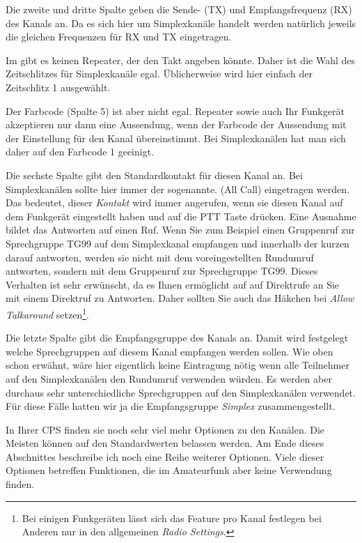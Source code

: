 Die zweite und dritte Spalte geben die Sende- (TX) und Empfangsfrequenz (RX) des Kanals an. Da es sich hier um Simplexkanäle handelt werden natürlich jeweils die gleichen Frequenzen für RX und TX eingetragen. 

Im  gibt es keinen Repeater, der den Takt angeben könnte. Daher ist die Wahl des Zeitschlitzes für Simplexkanäle egal. Üblicherweise wird hier einfach der Zeitschlitz 1 ausgewählt.

Der Farbcode (Spalte 5) ist aber nicht egal. Repeater sowie auch Ihr Funkgerät akzeptieren nur dann eine Aussendung, wenn der Farbcode der Aussendung mit der Einstellung für den Kanal übereinstimmt. Bei Simplexkanälen hat man sich daher auf den Farbcode 1 geeinigt. 

Die sechste Spalte gibt den Standardkontakt für diesen Kanal an. Bei Simplexkanälen sollte hier immer der sogenannte.  (All Call) eingetragen werden. Das bedeutet, dieser \emph{Kontakt} wird immer angerufen, wenn sie diesen Kanal auf dem Funkgerät eingestellt haben und auf die PTT Taste drücken. Eine Ausnahme bildet das Antworten auf einen Ruf. Wenn Sie zum Beispiel einen Gruppenruf zur Sprechgruppe TG99 auf dem Simplexkanal empfangen und innerhalb der kurzen  darauf antworten, werden sie nicht mit dem voreingestellten Rundumruf antworten, sondern mit dem Gruppenruf zur Sprechgruppe TG99. Dieses Verhalten ist sehr erwünscht, da es Ihnen ermöglicht auf auf Direktrufe an Sie mit einem Direktruf zu Antworten. Daher sollten Sie auch das Häkchen bei \emph{Allow Talkaround} setzen\footnote{Bei einigen Funkgeräten lässt sich das Feature pro Kanal festlegen bei Anderen nur in den allgemeinen \emph{Radio Settings}.}.  

Die letzte Spalte gibt die Empfangsgruppe des Kanals an. Damit wird festgelegt welche Sprechgruppen auf diesem Kanal empfangen werden sollen. Wie oben schon erwähnt, wäre hier eigentlich keine Eintragung nötig wenn alle Teilnehmer auf den Simplexkanälen den Rundumruf verwenden würden. Es werden aber durchaus sehr unterschiedliche Sprechgruppen auf den Simplexkanälen verwendet. Für diese Fälle hatten wir ja die Empfangsgruppe \emph{Simplex} zusammengestellt. 

In Ihrer CPS finden sie noch sehr viel mehr Optionen zu den Kanälen. Die Meisten können auf den Standardwerten belassen werden. Am Ende dieses Abschnittes beschreibe ich noch eine Reihe weiterer Optionen. Viele dieser Optionen betreffen Funktionen, die im Amateurfunk aber keine Verwendung finden. 

